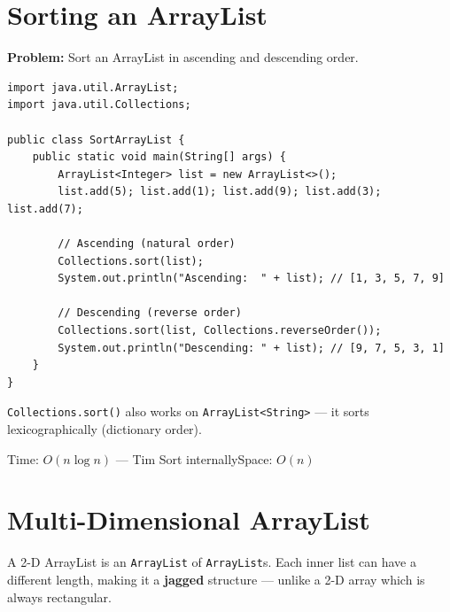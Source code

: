 \documentclass[12pt,a4paper,oneside]{book}
\begin{document}
\section{Sorting an ArrayList}

\textbf{Problem:} Sort an ArrayList in ascending and descending order.

\begin{lstlisting}[caption={Sort ArrayList --- Ascending and Descending}]
import java.util.ArrayList;
import java.util.Collections;

public class SortArrayList {
    public static void main(String[] args) {
        ArrayList<Integer> list = new ArrayList<>();
        list.add(5); list.add(1); list.add(9); list.add(3); list.add(7);

        // Ascending (natural order)
        Collections.sort(list);
        System.out.println("Ascending:  " + list); // [1, 3, 5, 7, 9]

        // Descending (reverse order)
        Collections.sort(list, Collections.reverseOrder());
        System.out.println("Descending: " + list); // [9, 7, 5, 3, 1]
    }
}
\end{lstlisting}

\begin{tipbox}
\texttt{Collections.sort()} also works on \texttt{ArrayList<String>} --- it sorts lexicographically (dictionary order).
\end{tipbox}

\begin{complexity}
Time: $O(n \log n)$ --- Tim Sort internally\quad Space: $O(n)$
\end{complexity}

\section{Multi-Dimensional ArrayList}

A 2-D ArrayList is an \texttt{ArrayList} of \texttt{ArrayList}s. Each inner list can have a different length, making it a \textbf{jagged} structure — unlike a 2-D array which is always rectangular.
\end{document}
